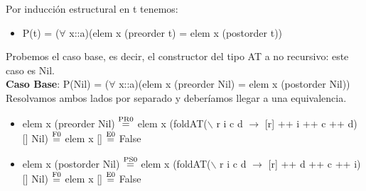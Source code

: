 \documentclass{article}
\begin{document}
Por inducción estructural en t tenemos: 
\begin{itemize}
    \item P(t) = ($\forall$ x::a)(elem x (preorder t) = elem x (postorder t))
\end{itemize}

Probemos el caso base, es decir, el constructor del tipo AT a no recursivo: este caso es Nil. \\ 
\textbf{Caso Base}: P(Nil) = ($\forall$ x::a)(elem x (preorder Nil) = elem x (postorder Nil)) \\ 
Resolvamos ambos lados por separado y deberíamos llegar a una equivalencia. 

\begin{itemize}
    \item elem x (preorder Nil) $\stackrel{\text{PR0}}{=}$ elem x (foldAT($\backslash$ r i c d $\rightarrow$ [r] ++ i ++ c ++ d) [] Nil) $\stackrel{\text{F0}}{=}$ elem x [] $\stackrel{\text{E0}}{=}$ False
    \item elem x (postorder Nil) $\stackrel{\text{PS0}}{=}$ elem x (foldAT($\backslash$ r i c d $\rightarrow$ [r] ++ d ++ c ++ i) [] Nil) $\stackrel{\text{F0}}{=}$ elem x [] $\stackrel{\text{E0}}{=}$ False
\end{itemize}
\end{document}

